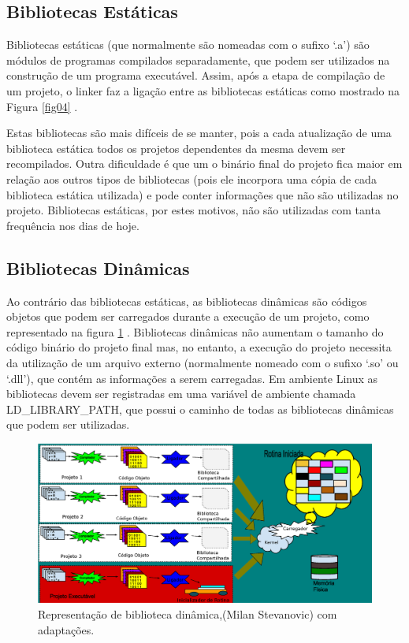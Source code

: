 \subsection{Bibliotecas Estáticas}

Bibliotecas estáticas (que normalmente  são nomeadas com o  sufixo ‘.a’) 
são módulos de programas compilados separadamente, que podem ser utilizados
 na construção de um programa executável. Assim, após a etapa de compilação de
 um projeto, o linker faz a ligação entre as bibliotecas estáticas como
 mostrado na Figura \ref{fig04} \cite{ref39}.

Estas bibliotecas são mais difíceis de se manter, pois a cada atualização de uma
 biblioteca estática todos os projetos dependentes da mesma devem ser recompilados.
 Outra dificuldade é que um o binário final do projeto fica maior em relação aos
 outros tipos de bibliotecas (pois ele incorpora uma cópia de cada biblioteca
 estática utilizada) e pode conter informações que não são utilizadas no projeto.
 Bibliotecas estáticas, por estes motivos, não são utilizadas com tanta
 frequência nos dias de hoje.


\subsection{Bibliotecas Dinâmicas}

Ao contrário das bibliotecas estáticas, as bibliotecas dinâmicas são códigos
 objetos que podem ser carregados durante a execução de um projeto, como
 representado na figura \ref{fig06} \cite{ref41}. Bibliotecas dinâmicas 
não aumentam o tamanho do código binário do projeto final mas, no entanto,
 a execução do projeto necessita da utilização de um arquivo externo
 (normalmente nomeado com o sufixo ‘.so’ ou ‘.dll’), que contém as
 informações a serem carregadas\cite{Lasca2}. Em ambiente Linux as
 bibliotecas devem ser  registradas em uma variável de ambiente chamada
 LD\_LIBRARY\_PATH, que possui o caminho de todas as bibliotecas dinâmicas
 que podem ser utilizadas.

\begin{figure}[h]
    \centering
        \includegraphics[keepaspectratio=true,scale=0.5]{figuras/dynamic_lib.eps}
    \caption{Representação de biblioteca dinâmica,(Milan Stevanovic) com adaptações.}
    \label{fig06}
\end{figure}


